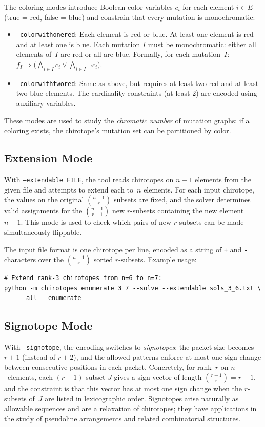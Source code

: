 \documentclass[11pt]{article}
\theoremstyle{definition}
\begin{document}
The coloring modes introduce Boolean color variables $c_i$ for each element $i \in E$ (true = red, false = blue) and constrain that every mutation is monochromatic:
\begin{itemize}
\item \texttt{--colorwithonered}: Each element is red or blue. At least one element is red and at least one is blue. Each mutation $I$ must be monochromatic: either all elements of~$I$ are red or all are blue. Formally, for each mutation~$I$: $f_I \Rightarrow \bigl(\bigwedge_{i \in I} c_i \lor \bigwedge_{i \in I} \neg c_i\bigr)$.
\item \texttt{--colorwithtwored}: Same as above, but requires at least two red and at least two blue elements. The cardinality constraints (at-least-2) are encoded using auxiliary variables.
\end{itemize}

These modes are used to study the \emph{chromatic number} of mutation graphs: if a coloring exists, the chirotope's mutation set can be partitioned by color.

\subsection{Extension Mode}

With \texttt{--extendable FILE}, the tool reads chirotopes on $n{-}1$ elements from the given file and attempts to extend each to~$n$ elements. For each input chirotope, the values on the original $\binom{n-1}{r}$ subsets are fixed, and the solver determines valid assignments for the $\binom{n-1}{r-1}$ new $r$-subsets containing the new element~$n{-}1$. This mode is used to check which pairs of new $r$-subsets can be made simultaneously flippable.

The input file format is one chirotope per line, encoded as a string of \texttt{+} and \texttt{-} characters over the $\binom{n-1}{r}$ sorted $r$-subsets. Example usage:
\begin{lstlisting}
# Extend rank-3 chirotopes from n=6 to n=7:
python -m chirotopes enumerate 3 7 --solve --extendable sols_3_6.txt \
    --all --enumerate
\end{lstlisting}

\subsection{Signotope Mode}

With \texttt{--signotope}, the encoding switches to \emph{signotopes}: the packet size becomes $r{+}1$ (instead of $r{+}2$), and the allowed patterns enforce at most one sign change between consecutive positions in each packet. Concretely, for rank~$r$ on $n$~elements, each $(r{+}1)$-subset $J$ gives a sign vector of length $\binom{r+1}{r} = r+1$, and the constraint is that this vector has at most one sign change when the $r$-subsets of~$J$ are listed in lexicographic order. Signotopes arise naturally as allowable sequences and are a relaxation of chirotopes; they have applications in the study of pseudoline arrangements and related combinatorial structures.
\end{document}
